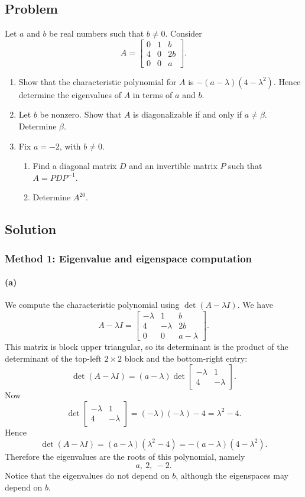 \documentclass[12pt]{article}
\begin{document}
\subsection{Problem}
Let $a$ and $b$ be real numbers such that $b\neq0$. Consider
\[
A=\begin{bmatrix}
0&1&b\\
4&0&2b\\
0&0&a
\end{bmatrix}.
\]
\begin{enumerate}[label=(\alph*)]
  \item Show that the characteristic polynomial for $A$ is $-(a-\lambda)(4-\lambda^2)$. Hence determine the eigenvalues of $A$ in terms of $a$ and $b$.
  \item Let $b$ be nonzero. Show that $A$ is diagonalizable if and only if $a\neq \beta$. Determine $\beta$.
  \item Fix $a=-2$, with $b\neq0$.
  \begin{enumerate}[label=(\roman*)]
    \item Find a diagonal matrix $D$ and an invertible matrix $P$ such that $A=PDP^{-1}$.
    \item Determine $A^{20}$.
  \end{enumerate}
\end{enumerate}

\subsection{Solution}


\subsubsection{Method 1: Eigenvalue and eigenspace computation}

\paragraph{(a)}
We compute the characteristic polynomial using $\det(A-\lambda I)$. We have
\[
A-\lambda I=
\begin{bmatrix}
-\lambda&1&b\\
4&-\lambda&2b\\
0&0&a-\lambda
\end{bmatrix}.
\]
This matrix is block upper triangular, so its determinant is the product of the determinant of the top-left $2\times2$ block and the bottom-right entry:
\[
\det(A-\lambda I)
=(a-\lambda)
\det\begin{bmatrix}-\lambda&1\\4&-\lambda\end{bmatrix}.
\]
Now
\[
\det\begin{bmatrix}-\lambda&1\\4&-\lambda\end{bmatrix}
=(-\lambda)(-\lambda)-4
=\lambda^2-4.
\]
Hence
\[
\det(A-\lambda I)=(a-\lambda)(\lambda^2-4)
=-(a-\lambda)(4-\lambda^2).
\]
Therefore the eigenvalues are the roots of this polynomial, namely
\[
\boxed{a,\ 2,\ -2.}
\]
Notice that the eigenvalues do not depend on $b$, although the eigenspaces may depend on $b$.
\end{document}
